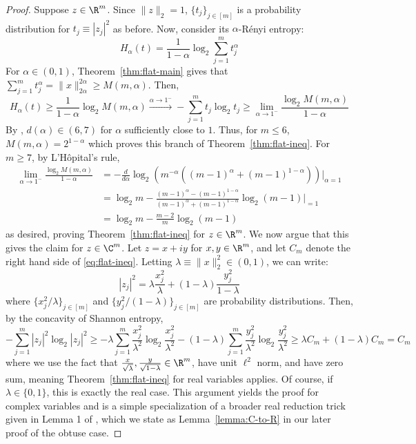 \documentclass[11pt]{article}
\begin{document}
\begin{proof}
    Suppose $z \in \R^m$. Since $\|z\|_2=1$, $\{t_j\}_{j\in[m]}$ is a probability distribution for $t_j\equiv |z_j|^2$ as before. Now, consider its $\alpha$-R\'enyi entropy:
    \begin{equation}
        H_\alpha(t)=\frac{1}{1-\alpha}\log_2 \sum_{j=1}^mt_j^\alpha
    \end{equation}
    For $\alpha \in (0,1)$, Theorem~\ref{thm:flat-main} gives that $\sum_{j=1}^{m}t_j^\alpha=\|x\|_{2\alpha}^{2\alpha}\geq M(m,\alpha)$. Then, 
    \begin{equation}
        H_\alpha(t)\geq \frac 1 {1-\alpha}\log_2 M(m,\alpha)\xrightarrow{\alpha\to1^-} -\sum_{j=1}^m t_j \log_2 t_j \geq \lim_{\alpha \to 1^-}\frac{\log_2 M(m,\alpha)}{1-\alpha}
    \end{equation}
    By \citep{holevo2026conjecturetightnorminequality}, $d(\alpha)\in (6,7)$ for $\alpha$ sufficiently close to $1$. Thus, for $m\leq 6$, $M(m,\alpha)= 2^{1-\alpha}$ which proves this branch of Theorem~\ref{thm:flat-ineq}. For $m\geq 7$, by L'H\^{o}pital's rule,
    \begin{equation}
    \begin{aligned}
        \lim_{\alpha \to 1^-}\frac{\log_2 M(m,\alpha)}{1-\alpha}&=-\frac d {d\alpha}\log_2 (m^{-\alpha}((m-1)^\alpha+(m-1)^{1-\alpha}))\bigg|_{\alpha=1}\\
        &=\log_2 m-\frac{(m-1)^\alpha-(m-1)^{1-\alpha}}{(m-1)^\alpha+(m-1)^{1-\alpha}}\log_2(m-1)\bigg|_{=1}\\
        &=\log_2 m -\frac{m-2}{m}\log_2(m-1)
    \end{aligned}
    \end{equation}
    as desired, proving Theorem~\ref{thm:flat-ineq} for $z\in \R^m$. We now argue that this gives the claim for $z\in \C^m$. Let $z=x+iy$ for $x,y\in \R^m$, and let $C_m$ denote the right hand side of \eqref{eq:flat-ineq}. Letting $\lambda\equiv \|x\|_2^2\in (0,1)$, we can write:
    \begin{equation}
        |z_j|^2=\lambda \frac{x_j^2}{\lambda}+(1-\lambda)\frac{y_j^2}{1-\lambda}
    \end{equation}
    where $\{x_j^2/\lambda\}_{j\in [m]}$ and $\{y_j^2/(1-\lambda)\}_{j\in[m]}$ are probability distributions. Then, by the concavity of Shannon entropy, 
    \begin{equation}
        -\sum_{j=1}^m|z_j|^2 \log_2 |z_j|^2 \geq -\lambda \sum_{j=1}^m \frac{x_j^2}{\lambda^2}\log_2 \frac{x_j^2}{\lambda^2}-(1-\lambda) \sum_{j=1}^m  \frac{y_j^2}{\lambda^2}\log_2 \frac{y_j^2}{\lambda^2}\geq \lambda C_m+(1-\lambda) C_m=C_m
    \end{equation}
    where we use the fact that $\frac{x}{\sqrt \lambda},\frac{y}{\sqrt{1-\lambda}}\in \R^m $, have unit $\ell^2$ norm, and have zero sum, meaning Theorem~\ref{thm:flat-ineq} for real variables applies. Of course, if $\lambda \in \{0,1\}$, this is exactly the real case. This argument yields the proof for complex variables and is a simple specialization of a broader real reduction trick given in Lemma 1 of \citep{holevo2025quantum}, which we state as Lemma~\ref{lemma:C-to-R} in our later proof of the obtuse case.  
\end{proof}
\end{document}
